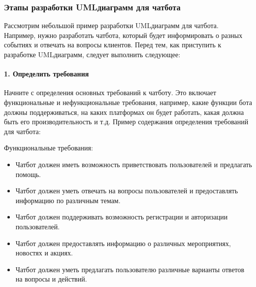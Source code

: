 \documentclass[letterpaper,10pt,russian]{sphinxmanual}
\begin{document}
\subsubsection{Этапы разработки UML\sphinxhyphen{}диаграмм для чат\sphinxhyphen{}бота}
\label{\detokenize{educational_materials/uml/content:id9}}
\sphinxAtStartPar
Рассмотрим небольшой пример разработки UML\sphinxhyphen{}диаграмм для чат\sphinxhyphen{}бота. Например, нужно разработать чат\sphinxhyphen{}бота, который будет информировать о разных событиях и отвечать на вопросы клиентов. Перед тем, как приступить к разработке UML\sphinxhyphen{}диаграмм, следует выполнить следующее:


\paragraph{1. Определить требования}
\label{\detokenize{educational_materials/uml/content:id10}}
\sphinxAtStartPar
Начните с определения основных требований к чат\sphinxhyphen{}боту. Это включает функциональные и нефункциональные требования, например, какие функции бота должны поддерживаться, на каких платформах он будет работать, какая должна быть его производительность и т.д.
Пример содержания определения требований для чат\sphinxhyphen{}бота:

 Функциональные требования:
\begin{itemize}
\item {} 
\sphinxAtStartPar
Чат\sphinxhyphen{}бот должен иметь возможность приветствовать пользователей и предлагать помощь.

\item {} 
\sphinxAtStartPar
Чат\sphinxhyphen{}бот должен уметь отвечать на вопросы пользователей и предоставлять информацию по различным темам.

\item {} 
\sphinxAtStartPar
Чат\sphinxhyphen{}бот должен поддерживать возможность регистрации и авторизации пользователей.

\item {} 
\sphinxAtStartPar
Чат\sphinxhyphen{}бот должен предоставлять информацию о различных мероприятиях, новостях и акциях.

\item {} 
\sphinxAtStartPar
Чат\sphinxhyphen{}бот должен уметь предлагать пользователю различные варианты ответов на вопросы и действий.

\end{itemize}
\end{document}
